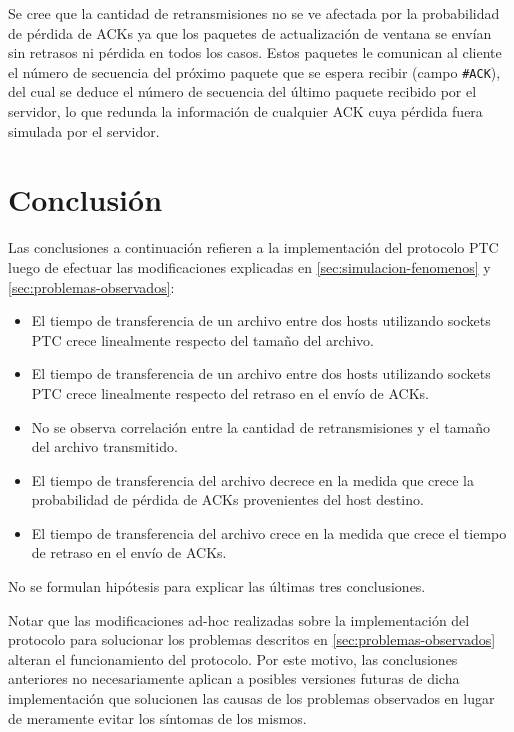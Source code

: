 \documentclass[a4paper, 10pt, twoside]{article}
\newcommand{\ack}{\texttt{\#ACK}\xspace}
\begin{document}
Se cree que la cantidad de retransmisiones no se ve afectada por la probabilidad de pérdida de ACKs ya que los paquetes de actualización de ventana se envían sin retrasos ni pérdida en todos los casos. Estos paquetes le comunican al cliente el número de secuencia del próximo paquete que se espera recibir (campo \ack), del cual se deduce el número de secuencia del último paquete recibido por el servidor, lo que redunda la información de cualquier ACK cuya pérdida fuera simulada por el servidor.




\section{Conclusión}

Las conclusiones a continuación refieren a la implementación del protocolo PTC luego de efectuar las modificaciones explicadas en \ref{sec:simulacion-fenomenos} y \ref{sec:problemas-observados}:

\begin{itemize}
  \item El tiempo de transferencia de un archivo entre dos hosts utilizando sockets PTC crece linealmente respecto del tamaño del archivo.

  \item El tiempo de transferencia de un archivo entre dos hosts utilizando sockets PTC crece linealmente respecto del retraso en el envío de ACKs.

  \item No se observa correlación entre la cantidad de retransmisiones y el tamaño del archivo transmitido.

  \item El tiempo de transferencia del archivo decrece en la medida que crece la probabilidad de pérdida de ACKs provenientes del host destino.

  \item El tiempo de transferencia del archivo crece en la medida que crece el tiempo de retraso en el envío de ACKs.
\end{itemize}

No se formulan hipótesis para explicar las últimas tres conclusiones.

Notar que las modificaciones ad-hoc realizadas sobre la implementación del protocolo para solucionar los problemas descritos en \ref{sec:problemas-observados} alteran el funcionamiento del protocolo. Por este motivo, las conclusiones anteriores no necesariamente aplican a posibles versiones futuras de dicha implementación que solucionen las causas de los problemas observados en lugar de meramente evitar los síntomas de los mismos.
\end{document}
